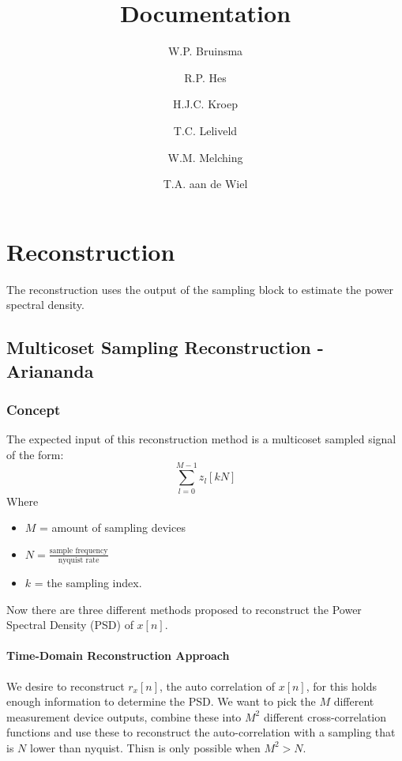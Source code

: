\documentclass[report, oneside, a4paper, openany]{memoir}
\title{Documentation}
\author{W.P. Bruinsma \and R.P. Hes \and H.J.C. Kroep \and T.C. Leliveld \and W.M. Melching \and T.A. aan de Wiel}
\begin{document}
\chapter{Reconstruction}
The reconstruction uses the output of the sampling block to estimate the power spectral density.

\section{Multicoset Sampling Reconstruction -Ariananda}
\subsection{Concept}
The expected input of this reconstruction method is a multicoset sampled signal of the form:
$$
\sum_{l=0}^{M-1}z_l[kN]
$$
Where
\begin{itemize}
\item $M$  = amount of sampling devices
\item $N = \frac{\text{sample frequency}}{\text{nyquist rate}}$
\item $k$ = the sampling index.
\end{itemize}

Now there are three different methods proposed to reconstruct the Power Spectral Density (PSD) of $x[n]$.

\subsubsection{Time-Domain Reconstruction Approach}
We desire to reconstruct $r_x[n]$, the auto correlation of $x[n]$, for this holds enough information to determine the PSD.
We want to pick the $M$ different measurement device outputs, combine these into $M^2$ different cross-correlation functions and use these to reconstruct the auto-correlation with a sampling that is $N$ lower than nyquist. Thisn is only possible when $M^2>N$.
\end{document}
